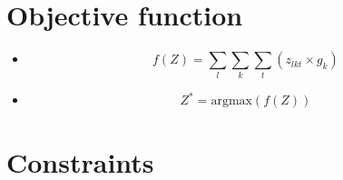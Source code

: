 \documentclass{article}
\begin{document}
\section{Objective function}
\begin{itemize}[label={}]
    \item \begin{equation}
        f(Z) = \sum_l \sum_k \sum_t (z_{lkt} \times g_{k})
    \end{equation}
    \item \begin{equation}
        Z^\ast = \text{argmax}(f(Z))
    \end{equation}
\end{itemize}

\section{Constraints}
\end{document}
